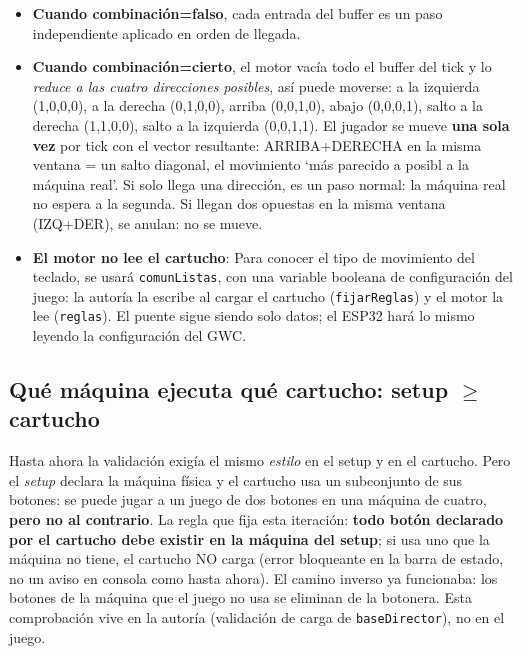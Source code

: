 \begin{itemize}
	\item \textbf{Cuando combinación=falso}, cada entrada del buffer es un paso independiente
	aplicado en orden de llegada.
	
	\item \textbf{Cuando combinación=cierto}, el motor vacía todo el buffer del tick y lo
	\emph{reduce a las cuatro direcciones posibles}, así puede moverse: a la izquierda (1,0,0,0), a la derecha (0,1,0,0), arriba (0,0,1,0), abajo (0,0,0,1), salto a la derecha (1,1,0,0), salto a la izquierda (0,0,1,1). El jugador se mueve \textbf{una sola vez} por tick con el vector
	resultante: ARRIBA+DERECHA en la misma ventana = un salto diagonal, el movimiento
	`más parecido a posibl a la máquina real'. Si solo llega una dirección, es
	un paso normal: la máquina real no espera a la segunda. Si llegan dos opuestas en la
	misma ventana (IZQ+DER), se anulan: no se mueve.
	
	\item \textbf{El motor no lee el cartucho}: Para conocer el tipo de movimiento del teclado, se usará \texttt{comunListas}, con una variable booleana de
	configuración del juego: la autoría la escribe al cargar el cartucho
	(\texttt{fijarReglas}) y el motor la lee (\texttt{reglas}). El puente sigue siendo
	solo datos; el ESP32 hará lo mismo leyendo la configuración del GWC.
\end{itemize}

\subsection{Qué máquina ejecuta qué cartucho: setup $\geq$ cartucho}
\label{subsec:SetupSuperiorCartucho}

Hasta ahora la validación exigía el mismo \emph{estilo} en el setup y en el cartucho. Pero el \textit{setup}
declara la máquina física y el cartucho usa un subconjunto de sus botones: se puede jugar
a un juego de dos botones en una máquina de cuatro, \textbf{pero no al contrario}. La
regla que fija esta iteración: \textbf{todo botón declarado por el cartucho debe existir
	en la máquina del setup}; si usa uno que la máquina no tiene, el cartucho NO carga
(error bloqueante en la barra de estado, no un aviso en consola como hasta ahora). El
camino inverso ya funcionaba: los botones de la máquina que el juego no usa se eliminan de
la botonera. Esta comprobación vive en la autoría (validación de carga de
\texttt{baseDirector}), no en el juego.

